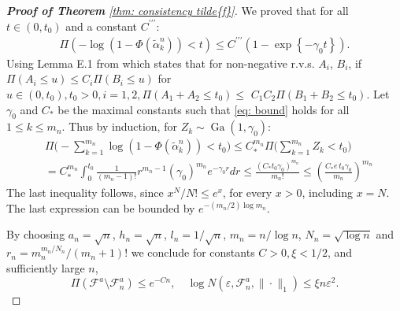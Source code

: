 \begin{proof}[\hypertarget{proof of thm consistency f tilde}{\textbf{Proof of Theorem}} \ref{thm: consistency tilde{f}}]
    We proved that for all $t \in (0,t_0)$ and a constant $C^{\prime \prime \prime}$: 
    \begin{align}\label{eq: bound}
    \Pi\left(-\log \left(1-\Phi\left(\tilde{\alpha}^n_k\right)\right)<t\right) \leq C^{\prime \prime \prime} \left( 1 - \exp \left\{ - \gamma_0 t \right\} \right).
    \end{align}
    Using Lemma E.1 from \cite{202} which states that for non-negative r.v.s. $A_i$, $B_i$, if $\Pi\left(A_i \leq u\right) \leq C_i \Pi\left(B_i \leq u\right)$ for $u \in\left(0, t_0\right), t_0>0, i=1,2, \Pi\left(A_1+A_2 \leq t_0\right) \leq$ $C_1 C_2 \Pi\left(B_1+B_2 \leq t_0\right)$. Let $\gamma_0$ and $C_*$ be the maximal constants such that \eqref{eq: bound} holds for all $1 \leq k \leq m_n$. Thus by induction, for $Z_k \sim \operatorname{Ga}(1,\gamma_0)$:
    \begin{align*}
        &\Pi \bigg( - \sum_{k=1}^{m_n} \log( 1 - \Phi(\tilde{\alpha}^n_k)) < t_0 \bigg)  \leq C_*^{m_n} \Pi \bigg( \sum_{k=1}^{m_n} Z_k < t_0 \bigg)   \\
        &=C_*^{m_n} \int_0^{t_0} \frac{1}{\left(m_n -1\right) !} r^{m_n -1}(\gamma_0)^{m_n} e^{-\gamma_0 r} d r \leq \frac{(C_* t_0\gamma_0)^{m_n}}{m_n !} \leq\left(\frac{C_* e \, t_0\gamma_0} {m_n}\right)^{m_n}
    \end{align*}
    The last inequality follows, since $x^N / N ! \leq e^x$, for every $x>0$, including $x=N$. The last expression can be bounded by $e^{-(m_n/2)\log{m_n}}$. 
    
    By choosing $a_n = \sqrt{n}$, $h_n = \sqrt{n}$, $l_n = 1/\sqrt{n}$, $m_n = n/\log{n}$, $N_n = \sqrt{\log{n}}$ and $r_n = m_n^{m_n/N_n}/(m_n+1)!$ we conclude for constants $C>0, \xi<1 / 2$, and sufficiently large $n$,
    $$
    \Pi\left(\mathcal{F}^a \setminus \mathcal{F}^a_n\right) \leq e^{-C n}, \quad \log N \left( \varepsilon, \mathcal{F}^a_n, \| \cdot \|_1 \right) \leq \xi n \varepsilon^2.
    $$
    \end{proof}

